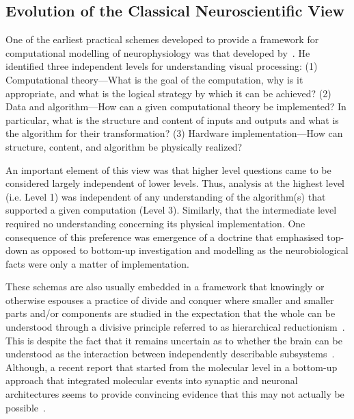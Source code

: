 \documentclass[11pt,3p,twocolumn]{JMN}
\begin{document}
\subsection{Evolution of the Classical Neuroscientific View}

One of the earliest practical schemes developed to provide a framework for computational modelling of neurophysiology was that developed by~\citet{Marr:19821kx}. He identified three independent levels for understanding visual processing: (1) Computational theory---What is the goal of the computation, why is it appropriate, and what is the logical strategy by which it can be achieved? (2) Data and algorithm---How can a given computational theory be implemented? In particular, what is the structure and content of inputs and outputs and what is the algorithm for their transformation? (3) Hardware implementation---How can structure, content, and algorithm be physically realized?

An important element of this view was that higher level questions came to be considered largely independent of lower levels. Thus, analysis at the highest level (i.e. Level 1) was independent of any understanding of the algorithm(s) that supported a given computation (Level 3). Similarly, that the intermediate level required no understanding concerning its physical implementation. One consequence of this preference was emergence of a doctrine that emphasised top-down as opposed to bottom-up investigation and modelling as the neurobiological facts were only a matter of implementation. 

These schemas are also usually embedded in a framework that knowingly or otherwise espouses a practice of divide and conquer where smaller and smaller parts and/or components are studied in the expectation that the whole can be understood through a divisive principle referred to as hierarchical reductionism~\citep{dawkins06}. This is despite the fact that it remains uncertain as to whether the brain can be understood as the interaction between independently describable subsystems~\citep{djurfeldt08}. Although, a recent report that started from the molecular level in a bottom-up approach that integrated molecular events into synaptic and neuronal architectures seems to provide convincing evidence that this may not actually be possible~\citep{bouteiller11}.
\end{document}
